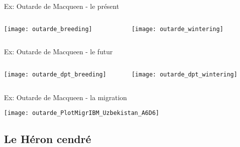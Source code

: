 \documentclass[]{beamer}
\begin{document}
\begin{frame}{Ex: Outarde de Macqueen - le présent}
    \begin{columns}
    \begin{column}[c]{0.5\textwidth}
    \texttt{[image: outarde\_breeding]}
     \end{column}
    \begin{column}[l]{0.5\textwidth}
    \begin{center}
       \texttt{[image: outarde\_wintering]} 
  \end{center}
       \end{column}
  \end{columns}
  \end{frame}
\begin{frame}{Ex: Outarde de Macqueen - le futur}
    \begin{columns}
    \begin{column}[c]{0.5\textwidth}
    \texttt{[image: outarde\_dpt\_breeding]}
     \end{column}
    \begin{column}[l]{0.5\textwidth}
    \begin{center}
       \texttt{[image: outarde\_dpt\_wintering]} 
  \end{center}
       \end{column}
  \end{columns}
\end{frame}
  
 \begin{frame}{Ex: Outarde de Macqueen - la migration}
  \begin{center}
   \texttt{[image: outarde\_PlotMigrIBM\_Uzbekistan\_A6D6]}
  \end{center}
 \end{frame}
  


\subsection{Le Héron cendré}
\end{document}
